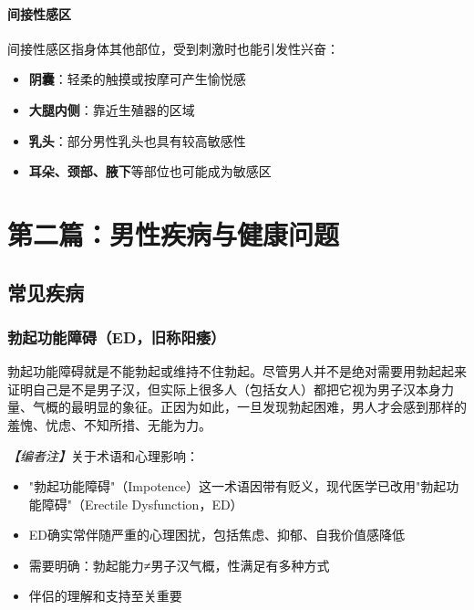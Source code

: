 \subsection{间接性感区}

间接性感区指身体其他部位，受到刺激时也能引发性兴奋：

\begin{itemize}
    \item \textbf{阴囊}：轻柔的触摸或按摩可产生愉悦感
    \item \textbf{大腿内侧}：靠近生殖器的区域
    \item \textbf{乳头}：部分男性乳头也具有较高敏感性
    \item \textbf{耳朵、颈部、腋下}等部位也可能成为敏感区
\end{itemize}

\part{第二篇：男性疾病与健康问题}

\chapter{常见疾病}

\section{勃起功能障碍（ED，旧称阳痿）}

勃起功能障碍就是不能勃起或维持不住勃起。尽管男人并不是绝对需要用勃起起来证明自己是不是男子汉，但实际上很多人（包括女人）都把它视为男子汉本身力量、气概的最明显的象征。正因为如此，一旦发现勃起困难，男人才会感到那样的羞愧、忧虑、不知所措、无能为力。

\noindent\textit{【编者注】}关于术语和心理影响：
\begin{itemize}
	\item "勃起功能障碍"（Impotence）这一术语因带有贬义，现代医学已改用"勃起功能障碍"（Erectile Dysfunction，ED）
	\item ED确实常伴随严重的心理困扰，包括焦虑、抑郁、自我价值感降低
	\item 需要明确：勃起能力≠男子汉气概，性满足有多种方式
	\item 伴侣的理解和支持至关重要
\end{itemize}

